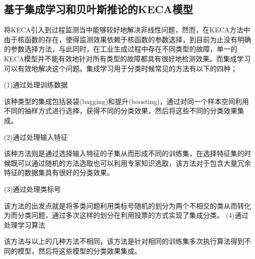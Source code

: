 \subsection{基于集成学习和贝叶斯推论的KECA模型}
将KECA引入到过程监测当中能够较好地解决非线性问题，然而，在KECA方法中由于核函数的存在，使得监测效果依赖于核函数的参数选择，到目前为止没有明确的参数选择方法，与此同时，在工业生成过程中存在不同类型的故障，单一的KECA模型并不能有效地针对所有类型的故障都具有很好地检测效果。而集成学习可以有效地解决这个问题。集成学习用于分类时候常见的方法有以下的四种；

(1)通过处理训练数据

该种类型的集成包括装袋(bagging)和提升(boosting)，通过对同一个样本空间利用不同的抽样方式进行选择，获得不同的分类效果，然后将这些不同的分类效果集成。

(2)通过处理输入特征

该种方法则是通过选择输入特征的子集从而形成不同的训练集，在选择特征集的时候既可以通过随机的方法选取也可以利用专家知识选取，该方法对于包含大量冗余特征的数据集具有很好的分类效果。

(3)通过处理类标号

该方法的出发点就是将多类问题利用类标号随机的划分为两个不相交的类从而转化为而分类问题，通过多次这样的划分在利用投票的方式实现了集成分类。
(4)通过处理学习算法

该方法与以上的几种方法不相同，该方法是针对相同的训练集多次执行算法得到不同的模型，然后将这些模型的分类效果集成。

